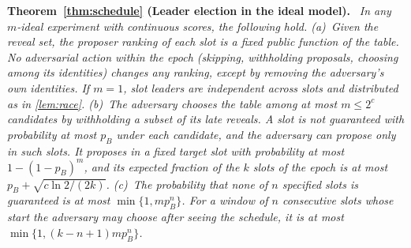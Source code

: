 \documentclass[10pt,journal,compsoc]{IEEEtran}
\theoremstyle{tplain}
\theoremstyle{tdef}
\theoremstyle{remark}
\newenvironment{restate}[1]{\par\smallskip\noindent\textbf{#1.}\ \itshape\ignorespaces}{\par\smallskip}
\begin{document}
\begin{restate}{Theorem~\ref{thm:schedule} (Leader election in the ideal model)}
In any $m$-ideal experiment with continuous scores, the following hold. (a)~Given the reveal set, the proposer ranking of each slot is a fixed public function of the table. No adversarial action within the epoch (skipping, withholding proposals, choosing among its identities) changes any ranking, except by removing the adversary's own identities. If $m=1$, slot leaders are independent across slots and distributed as in \cref{lem:race}. (b)~The adversary chooses the table among at most $m\le 2^c$ candidates by withholding a subset of its late reveals. A slot is not guaranteed with probability at most $p_B$ under each candidate, and the adversary can propose only in such slots. It proposes in a fixed target slot with probability at most $1-(1-p_B)^m$, and its expected fraction of the $k$ slots of the epoch is at most $p_B+\sqrt{c\ln 2/(2k)}$. (c)~The probability that none of $n$ specified slots is guaranteed is at most $\min\{1,mp_B^{n}\}$. For a window of $n$ consecutive slots whose start the adversary may choose after seeing the schedule, it is at most $\min\{1,(k-n+1)mp_B^{n}\}$.
\end{restate}
\end{document}

